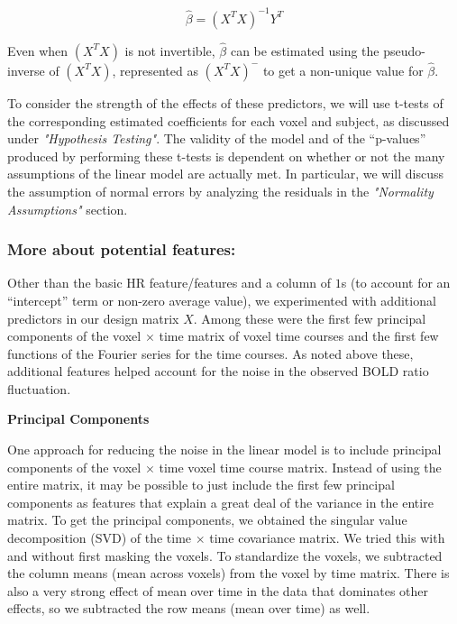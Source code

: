 \begin{equation}
\hat{\beta} =(X^T X)^{-1} Y^T
\end{equation}

\par Even when $(X^T X)$ is not invertible, $\hat{\beta}$ can be estimated 
using the pseudo-inverse of $(X^T X)$, represented as $(X^T X)^{-}$ to get a 
non-unique value for $\hat{\beta}$.

\par To consider the strength of the effects of these predictors, we will use 
t-tests of the corresponding estimated coefficients for each voxel and 
subject, as discussed under \textit{"Hypothesis Testing"}. The validity of the 
model and of the ``p-values'' produced by performing these t-tests is 
dependent on whether or not the many assumptions of the linear model are 
actually met. In particular, we will discuss the assumption of normal errors 
by analyzing the residuals in the \textit{"Normality Assumptions"} section. 

\subsubsection{More about potential features:}
\par Other than the basic HR feature/features and a column of $1$s (to account 
for an ``intercept'' term or non-zero average value), we experimented with 
additional predictors in our design matrix $X$. Among these were the 
first few principal components of the voxel $\times$ time matrix of voxel time 
courses and the first few functions of the Fourier series for the time courses. 
As noted above these, additional features helped account for the noise in the 
observed BOLD ratio fluctuation.

\vspace{2mm}
\noindent \textbf{Principal Components}
\vspace{2mm}
\par One approach for reducing the noise in the linear model is to include 
principal components of the voxel $\times$ time voxel time course matrix. 
Instead of using the entire matrix, it may be possible to just include the 
first few principal components as features that explain a great deal of the 
variance in the entire matrix. To get the principal components, we obtained 
the singular value decomposition (SVD) of the time $\times$ time covariance 
matrix. We tried this with and without first masking the voxels. To 
standardize the voxels, we subtracted the column means (mean across voxels) 
from the voxel by time matrix. There is also a very strong effect of mean 
over time in the data that dominates other effects, so we subtracted the 
row means (mean over time) as well.

